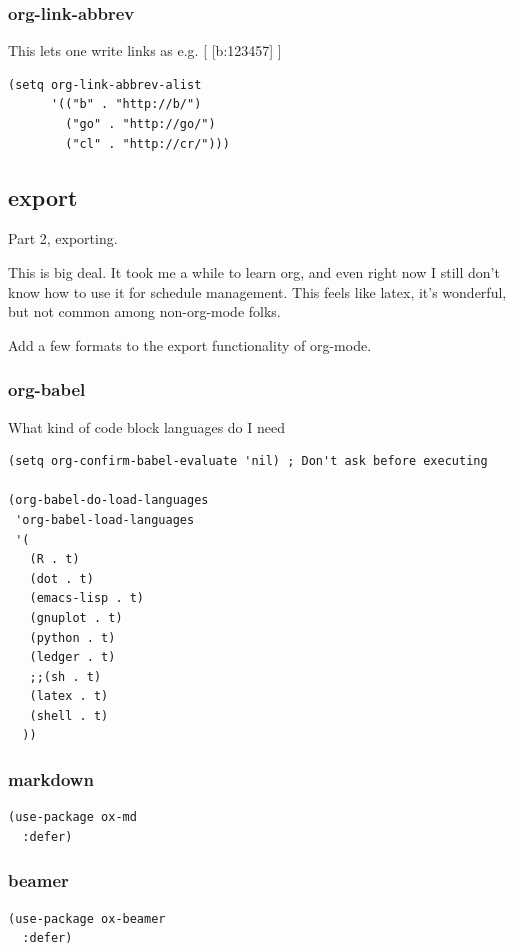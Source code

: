 \documentclass[11pt]{article}
\begin{document}
\subsubsection{org-link-abbrev}
\label{sec:org9350970}

This lets one write links as e.g. [ [b:123457] ]

\begin{verbatim}
(setq org-link-abbrev-alist
      '(("b" . "http://b/")
        ("go" . "http://go/")
        ("cl" . "http://cr/")))
\end{verbatim}
\subsection{export}
\label{sec:org5ac5bec}

Part 2, exporting.

This is big deal. It took me a while to learn org, and even right now
I still don't know how to use it for schedule management. This feels
like latex, it's wonderful, but not common among non-org-mode folks.

Add a few formats to the export functionality of org-mode.
\subsubsection{org-babel}
\label{sec:orgfaac233}

What kind of code block languages do I need

\begin{verbatim}
(setq org-confirm-babel-evaluate 'nil) ; Don't ask before executing

(org-babel-do-load-languages
 'org-babel-load-languages
 '(
   (R . t)
   (dot . t)
   (emacs-lisp . t)
   (gnuplot . t)
   (python . t)
   (ledger . t)
   ;;(sh . t)
   (latex . t)
   (shell . t)
  ))
\end{verbatim}

\subsubsection{markdown}
\label{sec:org5724dba}
\begin{verbatim}
(use-package ox-md
  :defer)
\end{verbatim}
\subsubsection{beamer}
\label{sec:org527797a}
\begin{verbatim}
(use-package ox-beamer
  :defer)
\end{verbatim}
\end{document}
